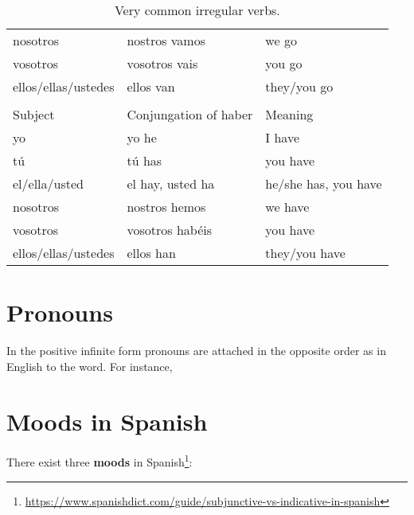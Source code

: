 \documentclass[a4paper,12pt]{article}
\begin{document}
\begin{table}[H]
\begin{tabular}{lll}
  nosotros            & nostros vamos                  & we go                \\
  vosotros            & vosotros vais                  & you go               \\
  ellos/ellas/ustedes & ellos van                      & they/you go          \\
  \midrule
                      &                                &                      \\
  Subject             & Conjungation of \textsf{haber} & Meaning              \\
  \toprule
  yo                  & yo he                          & I have               \\
  tú                  & tú has                         & you have             \\
  el/ella/usted       & el hay, usted ha               & he/she has, you have \\
  nosotros            & nostros hemos                  & we have              \\
  vosotros            & vosotros habéis                & you have             \\
  ellos/ellas/ustedes & ellos han                      & they/you have        \\
  \bottomrule
\end{tabular}
\caption{\label{tbl:} Very common irregular verbs.}
\end{table}


\pagebreak[4]


\section{Pronouns}

In the positive infinite form pronouns are attached in the opposite order as in English to the word.
For instance,


\section{Moods in Spanish}

There exist three \textbf{moods} in
Spanish\footnote{\url{https://www.spanishdict.com/guide/subjunctive-vs-indicative-in-spanish}}:
\end{document}
